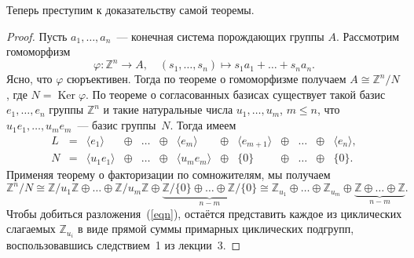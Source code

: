 \documentclass[a4paper,10pt]{amsart}
\newcommand{\Ker}{\mathop{\mathrm{Ker}}}
\def\ZZ{{\mathbb Z}}%
\theoremstyle{definition}
\theoremstyle{remark}
\begin{document}
Теперь преступим к доказательству самой теоремы.

\begin{proof}
Пусть $a_1,\ldots,a_n$~--- конечная система порождающих группы $A$.
Рассмотрим гомоморфизм
$$
\varphi \colon \ZZ^n \to A, \quad (s_1, \ldots, s_n) \mapsto s_1 a_1
+ \ldots + s_n a_n.
$$
Ясно, что $\varphi$ сюръективен. Тогда по теореме о гомоморфизме
получаем $A \cong \ZZ^n / N$, где $N = \Ker \varphi$. По теореме о
согласованных базисах существует такой базис $e_1, \ldots, e_n$
группы $\ZZ^n$ и такие натуральные числа $u_1, \ldots, u_m$, $m
\leqslant n$, что $u_1 e_1, \ldots, u_m e_m$~--- базис группы~$N$.
Тогда имеем
$$
\begin{array}{ccccccccccccc}
L &=& \langle e_1 \rangle &\oplus & \ldots & \oplus & \langle e_m
\rangle & \oplus & \langle e_{m+1} \rangle & \oplus & \ldots &
\oplus & \langle e_n \rangle, \\
N &=& \langle u_1e_1 \rangle & \oplus & \ldots & \oplus & \langle
u_m e_m \rangle &\oplus & \lbrace 0 \rbrace & \oplus & \ldots &
\oplus & \lbrace 0 \rbrace.
\end{array}
$$
Применяя теорему о факторизации по сомножителям, мы получаем
$$
\ZZ^n / N \cong \ZZ / u_1 \ZZ \oplus \ldots \oplus \ZZ / u_m \ZZ
\oplus \underbrace{\ZZ / \lbrace 0 \rbrace \oplus \ldots \oplus \ZZ
/ \lbrace 0 \rbrace}_{n-m} \cong \ZZ_{u_1} \oplus \ldots \oplus
\ZZ_{u_m} \oplus \underbrace{\ZZ \oplus \ldots \oplus \ZZ}_{n-m}.
$$
Чтобы добиться разложения~(\ref{eqn}), остаётся представить каждое
из циклических слагаемых $\ZZ_{u_i}$ в виде прямой суммы примарных
циклических подгрупп, воспользовавшись следствием~1 из лекции~3.


\end{proof}
\end{document}

